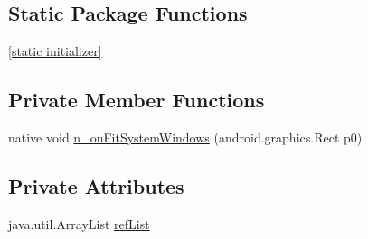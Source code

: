 \subsection*{Static Package Functions}
\begin{CompactItemize}
\item 
\hyperlink{classmono_1_1android_1_1support_1_1v7_1_1widget_1_1_fit_windows_view_group___on_fit_system_windows_listener_implementor_2db67a3da74b34b61c5b3faab439fda7}{\mbox{[}static initializer\mbox{]}}
\end{CompactItemize}
\subsection*{Private Member Functions}
\begin{CompactItemize}
\item 
native void \hyperlink{classmono_1_1android_1_1support_1_1v7_1_1widget_1_1_fit_windows_view_group___on_fit_system_windows_listener_implementor_76eb80f71c86ac5c45cdee34b1d5f8d2}{n\_\-onFitSystemWindows} (android.graphics.Rect p0)
\end{CompactItemize}
\subsection*{Private Attributes}
\begin{CompactItemize}
\item 
java.util.ArrayList \hyperlink{classmono_1_1android_1_1support_1_1v7_1_1widget_1_1_fit_windows_view_group___on_fit_system_windows_listener_implementor_18103d9bee4928836967deb4f490da6c}{refList}
\end{CompactItemize}


